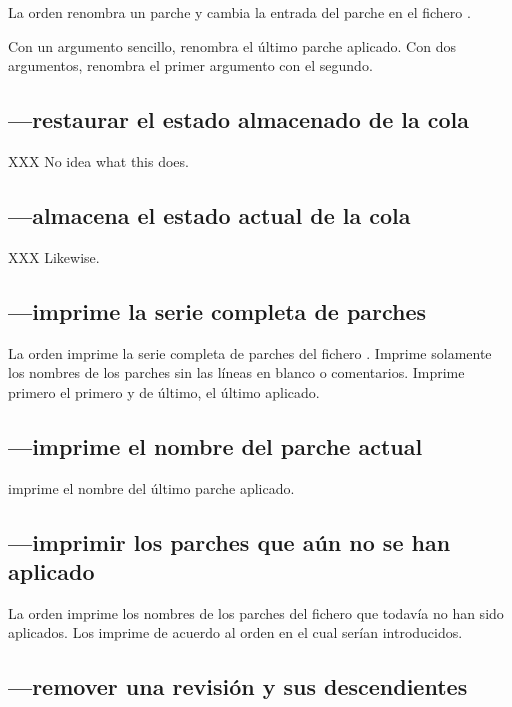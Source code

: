 La orden  renombra un parche y cambia la entrada
del parche en el fichero .

Con un argumento sencillo,  renombra el último
parche aplicado.  Con dos argumentos, renombra el primer argumento con
el segundo.

\subsection{---restaurar el estado almacenado de
  la cola}

XXX No idea what this does.

\subsection{---almacena el estado actual de la cola}

XXX Likewise.

\subsection{---imprime la serie completa de parches}

La orden  imprime la serie completa de parches del
fichero .  Imprime solamente los nombres de los
parches sin las líneas en blanco o comentarios.  Imprime primero el
primero y de último, el último aplicado.

\subsection{---imprime el nombre del parche actual}

 imprime el nombre del último parche aplicado.

\subsection{---imprimir los parches que aún no
  se han aplicado}

La orden  imprime los nombres de los parches
del fichero  que todavía no han sido aplicados.  Los
imprime de acuerdo al orden en el cual serían introducidos.

\subsection{---remover una revisión y sus descendientes}

